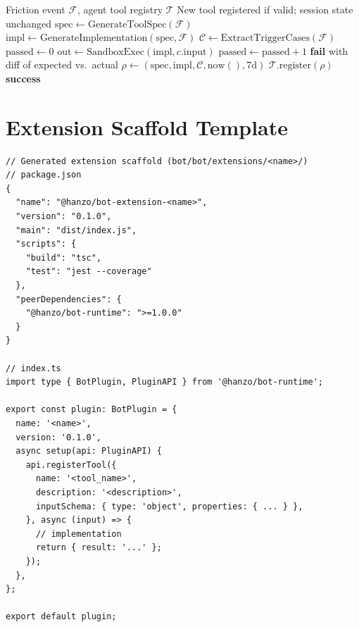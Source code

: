 \documentclass[11pt]{article}
\begin{document}
\begin{algorithm}[H]
\caption{Tier 1: Runtime Tool Hot-Reload}
\label{alg:tier1}
\begin{algorithmic}[1]
\Require Friction event $\mathcal{F}$, agent tool registry $\mathcal{T}$
\Ensure New tool registered if valid; session state unchanged
\State $\text{spec} \gets \text{GenerateToolSpec}(\mathcal{F})$
\State $\text{impl} \gets \text{GenerateImplementation}(\text{spec}, \mathcal{F})$
\State $\mathcal{C} \gets \text{ExtractTriggerCases}(\mathcal{F})$
\State $\text{passed} \gets 0$
    \State $\text{out} \gets \text{SandboxExec}(\text{impl}, c.\text{input})$
        \State $\text{passed} \gets \text{passed} + 1$
    \EndIf
\EndFor
{}
    \State \Return \textbf{fail} with diff of expected vs.\ actual
\EndIf
\State $\rho \gets (\text{spec}, \text{impl}, \mathcal{C}, \text{now}(), 7\text{d})$
\State $\mathcal{T}.\text{register}(\rho)$
\State \Return \textbf{success}
\end{algorithmic}
\end{algorithm}

\section{Extension Scaffold Template}
\label{app:ext-scaffold}

\begin{verbatim}
// Generated extension scaffold (bot/bot/extensions/<name>/)
// package.json
{
  "name": "@hanzo/bot-extension-<name>",
  "version": "0.1.0",
  "main": "dist/index.js",
  "scripts": {
    "build": "tsc",
    "test": "jest --coverage"
  },
  "peerDependencies": {
    "@hanzo/bot-runtime": ">=1.0.0"
  }
}

// index.ts
import type { BotPlugin, PluginAPI } from '@hanzo/bot-runtime';

export const plugin: BotPlugin = {
  name: '<name>',
  version: '0.1.0',
  async setup(api: PluginAPI) {
    api.registerTool({
      name: '<tool_name>',
      description: '<description>',
      inputSchema: { type: 'object', properties: { ... } },
    }, async (input) => {
      // implementation
      return { result: '...' };
    });
  },
};

export default plugin;
\end{verbatim}
\end{document}
